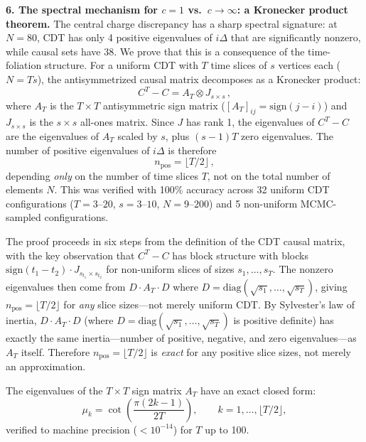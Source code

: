 \documentclass[aps,prd,twocolumn,superscriptaddress,nofootinbib]{revtex4-2}
\begin{document}
\textbf{6. The spectral mechanism for $c = 1$ vs.\ $c \to \infty$: a Kronecker product theorem.} The central charge discrepancy has a sharp spectral signature: at $N = 80$, CDT has only 4 positive eigenvalues of $i\Delta$ that are significantly nonzero, while causal sets have 38. We prove that this is a consequence of the time-foliation structure. For a uniform CDT with $T$ time slices of $s$ vertices each ($N = Ts$), the antisymmetrized causal matrix decomposes as a Kronecker product:
\begin{equation}
C^T - C = A_T \otimes J_{s \times s}\,,
\label{eq:kronecker}
\end{equation}
where $A_T$ is the $T \times T$ antisymmetric sign matrix ($[A_T]_{ij} = \mathrm{sign}(j - i)$) and $J_{s \times s}$ is the $s \times s$ all-ones matrix. Since $J$ has rank 1, the eigenvalues of $C^T - C$ are the eigenvalues of $A_T$ scaled by $s$, plus $(s-1)T$ zero eigenvalues. The number of positive eigenvalues of $i\Delta$ is therefore
\begin{equation}
n_{\mathrm{pos}} = \lfloor T/2 \rfloor\,,
\end{equation}
depending \emph{only} on the number of time slices $T$, not on the total number of elements $N$. This was verified with 100\% accuracy across 32 uniform CDT configurations ($T = 3$--$20$, $s = 3$--$10$, $N = 9$--$200$) and 5 non-uniform MCMC-sampled configurations.

The proof proceeds in six steps from the definition of the CDT causal matrix, with the key observation that $C^T - C$ has block structure with blocks $\mathrm{sign}(t_1 - t_2) \cdot J_{s_{t_1} \times s_{t_2}}$ for non-uniform slices of sizes $s_1, \ldots, s_T$. The nonzero eigenvalues then come from $D \cdot A_T \cdot D$ where $D = \mathrm{diag}(\sqrt{s_1}, \ldots, \sqrt{s_T})$, giving $n_{\mathrm{pos}} = \lfloor T/2 \rfloor$ for \emph{any} slice sizes---not merely uniform CDT. By Sylvester's law of inertia, $D \cdot A_T \cdot D$ (where $D = \mathrm{diag}(\sqrt{s_1}, \ldots, \sqrt{s_T})$ is positive definite) has exactly the same inertia---number of positive, negative, and zero eigenvalues---as $A_T$ itself. Therefore $n_{\mathrm{pos}} = \lfloor T/2 \rfloor$ is \emph{exact} for any positive slice sizes, not merely an approximation.

The eigenvalues of the $T \times T$ sign matrix $A_T$ have an exact closed form:
\begin{equation}
\mu_k = \cot\!\left(\frac{\pi(2k-1)}{2T}\right), \qquad k = 1, \ldots, \lfloor T/2 \rfloor,
\end{equation}
verified to machine precision ($< 10^{-14}$) for $T$ up to 100.
\end{document}
